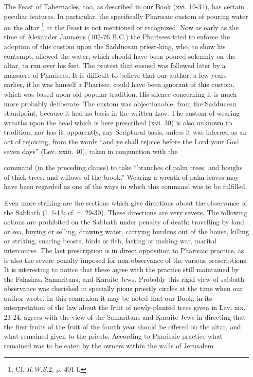 The Feast of Tabernacles, too, as described in our Book (xvi. 10-31), has certain peculiar features. In particular, the specifically Pharisaic custom of pouring water on the altar \footnote{Cf. \emph{R.W.S.}2, p. 401 f.} at the Feast is not mentioned or recognized. Now as early as the time of Alexander Jannæus (102-76 B.C.) the Pharisees tried to enforce the adoption of this custom upon the Sadducean priest-king, who, to show his contempt, allowed the water, which should have been poured solemnly on the altar, to run over his feet. The protest that ensued was followed later by a massacre of Pharisees. It is difficult to believe that our author, a few years earlier, if he was himself a Pharisee, could have been ignorant of this custom, which was based upon old popular tradition. His silence concerning it is much more probably deliberate. The custom was objectionable, from the Sadducean standpoint, because it had no basis in the written Law. The custom of wearing wreaths upon the head which is here prescribed (xvi. 30) is also unknown to tradition; nor has it, apparently, any Scriptural basis, unless it was inferred as an act of rejoicing, from the words ``and ye shall rejoice before the Lord your God seven days'' (Lev. xxiii. 40), taken in conjunction with the

command (in the preceding clause) to take ``branches of palm trees, and boughs of thick trees, and willows of the brook.'' Wearing a wreath of palm-leaves may have been regarded as one of the ways in which this command was to be fulfilled.

Even more striking are the sections which give directions about the observance of the Sabbath (l. 1-13; cf. ii. 29-30). These directions are very severe. The following actions are prohibited on the Sabbath under penalty of death: travelling by land or sea, buying or selling, drawing water, carrying burdens out of the house, killing or striking, snaring beasts, birds or fish, fasting or making war, marital intercourse. The last prescription is in direct opposition to Pharisaic practice, as is also the severe penalty imposed for non-observance of the various prescriptions. It is interesting to notice that these agree with the practice still maintained by the Falashas, Samaritans, and \d{K}araite Jews. Probably this rigid view of sabbath-observance was cherished in specially pious priestly circles at the time when our author wrote. In this connexion it may be noted that our Book, in its interpretation of the law about the fruit of newly-planted trees given in Lev. xix. 23-24, agrees with the view of the Samaritans and \d{K}araite Jews in directing that the first fruits of the fruit of the fourth year should be offered on the altar, and what remained given to the priests. According to Pharisaic practice what remained was to be eaten by the owners within the walls of Jerusalem.

